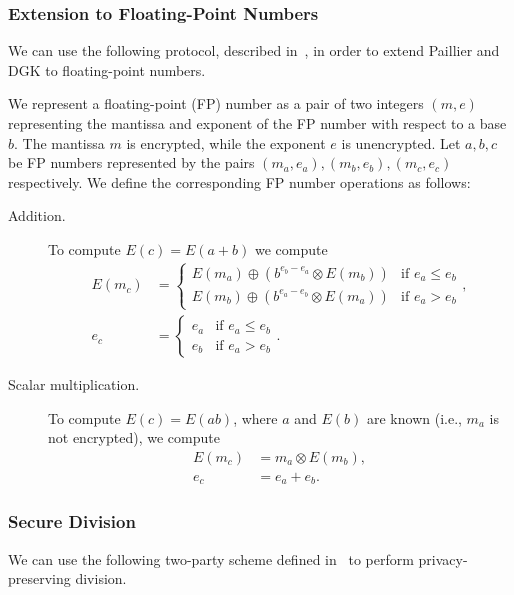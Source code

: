 \subsubsection{Extension to Floating-Point Numbers}
\label{sec:fp_number_extension}
We can use the following protocol, described in~\cite{ziad_cryptoimg:_2016}, in order to extend Paillier and DGK to floating-point numbers.

We represent a floating-point (FP) number as a pair of two integers $(m,e)$ representing the mantissa and exponent of the FP number with respect to a base $b$. The mantissa $m$ is encrypted, while the exponent $e$ is unencrypted.
Let $a,b,c$ be FP numbers represented by the pairs $(m_a,e_a),(m_b,e_b),(m_c,e_c)$ respectively. We define the corresponding FP number operations as follows:
\begin{description}
  \item[Addition.]
    To compute $E\left(c\right)=E\left(a+b\right)$ we compute
	\begin{align*}
		E\left(m_c\right) &= 
		\begin{cases}
			E\left(m_a\right) \oplus \left(b^{e_b-e_a} \otimes E\left(m_b\right)\right) & \text{if } e_a \leq e_b \\
			E\left(m_b\right) \oplus \left(b^{e_a-e_b} \otimes E\left(m_a\right)\right) & \text{if } e_a > e_b
		\end{cases}, \\
		e_c &= 
		\begin{cases}
			e_a & \text{if } e_a \leq e_b \\
			e_b & \text{if } e_a > e_b
		\end{cases}.
	\end{align*}
  \item[Scalar multiplication.]
    To compute $E\left(c\right) = E\left(ab\right)$, where $a$ and $E\left(b\right)$ are known (i.e., $m_a$ is not encrypted), we compute
    \begin{align*}
      E\left(m_c\right) &= m_a \otimes E\left(m_b\right),\\
      e_c &= e_a + e_b.
    \end{align*}
\end{description}

\subsubsection{Secure Division}
We can use the following two-party scheme defined in~\cite{boukoros_lightweight_2017} to perform privacy-preserving division.

